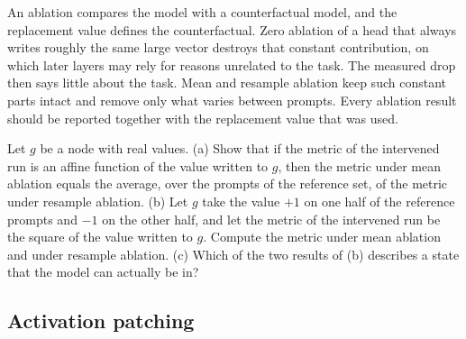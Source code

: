 \begin{caution}
An ablation compares the model with a counterfactual model, and the replacement value defines the
counterfactual. Zero ablation of a head that always writes roughly the same large vector destroys that constant
contribution, on which later layers may rely for reasons unrelated to the task. The measured drop then says
little about the task. Mean and resample ablation keep such constant parts intact and remove only what varies
between prompts. Every ablation result should be reported together with the replacement value that was used.
\end{caution}

\begin{exercise}\label{ex:meanresample}
Let $g$ be a node with real values. (a) Show that if the metric of the intervened run is an affine function of
the value written to $g$, then the metric under mean ablation equals the average, over the prompts of the
reference set, of the metric under resample ablation. (b) Let $g$ take the value $+1$ on one half of the reference
prompts and $-1$ on the other half, and let the metric of the intervened run be the square of the value written
to $g$. Compute the metric under mean ablation and under resample ablation. (c) Which of the two results of (b)
describes a state that the model can actually be in?
\end{exercise}

\subsection{Activation patching}
\label{sec:patching}

